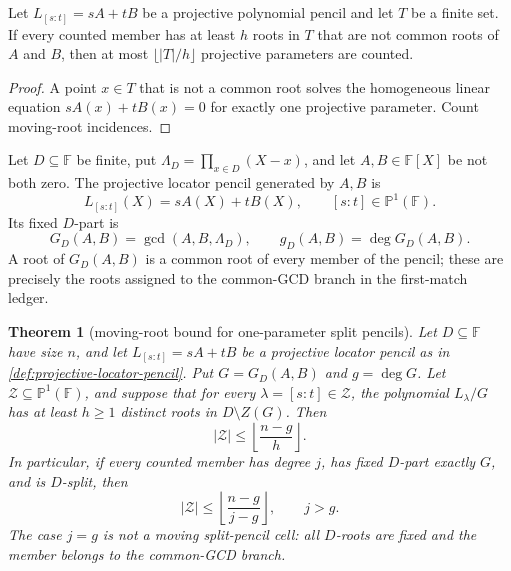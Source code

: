 \documentclass[11pt,a4paper]{amsart}
\numberwithin{equation}{section}
\newtheorem{theorem}{Theorem}[section]
\theoremstyle{remark}
\newcommand{\F}{\mathbb F}\newcommand{\B}{\mathbb B}\newcommand{\K}{\mathbb K}\newcommand{\Z}{\mathbb Z}
\begin{document}
\begin{lemma}\label{lem:pencil-payment}
Let $L_{[s:t]}=sA+tB$ be a projective polynomial pencil and let $T$ be a finite set.  If every counted member has at least $h$ roots in $T$ that are not common roots of $A$ and $B$, then at most $\lfloor |T|/h\rfloor$ projective parameters are counted.
\end{lemma}
\begin{proof}
A point $x\in T$ that is not a common root solves the homogeneous linear equation $sA(x)+tB(x)=0$ for exactly one projective parameter.  Count moving-root incidences.
\end{proof}

\begin{definition}\label{def:projective-locator-pencil}
Let \(D\subseteq\F\) be finite, put \(\Lambda_D=\prod_{x\in D}(X-x)\), and let \(A,B\in\F[X]\) be not both zero.  The projective locator pencil generated by \(A,B\) is
\[
        L_{[s:t]}(X)=sA(X)+tB(X),\qquad [s:t]\in\mathbb P^1(\F).
\]
Its fixed \(D\)-part is
\[
        G_D(A,B)=\gcd(A,B,\Lambda_D),
        \qquad g_D(A,B)=\deg G_D(A,B).
\]
A root of \(G_D(A,B)\) is a common root of every member of the pencil; these are precisely the roots assigned to the common-GCD branch in the first-match ledger.
\end{definition}

\begin{theorem}[moving-root bound for one-parameter split pencils]\label{thm:bc-moving-root}
Let \(D\subseteq\F\) have size \(n\), and let \(L_{[s:t]}=sA+tB\) be a projective locator pencil as in \cref{def:projective-locator-pencil}.  Put \(G=G_D(A,B)\) and \(g=\deg G\).  Let \(\mathcal Z\subseteq\mathbb P^1(\F)\), and suppose that for every \(\lambda=[s:t]\in\mathcal Z\), the polynomial \(L_\lambda/G\) has at least \(h\ge1\) distinct roots in \(D\setminus Z(G)\).  Then
\[
        |\mathcal Z|\le \left\lfloor\frac{n-g}{h}\right\rfloor .
\]
In particular, if every counted member has degree \(j\), has fixed \(D\)-part exactly \(G\), and is \(D\)-split, then
\[
        |\mathcal Z|\le
        \left\lfloor\frac{n-g}{j-g}\right\rfloor,
        \qquad j>g.
\]
The case \(j=g\) is not a moving split-pencil cell: all \(D\)-roots are fixed and the member belongs to the common-GCD branch.
\end{theorem}
\end{document}
